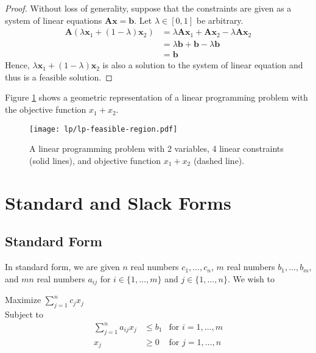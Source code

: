 \begin{proof}
    Without loss of generality, suppose that the constraints are given as a system of linear equations $\mathbf{A}\mathbf{x} = \mathbf{b}$. Let $\lambda \in [0,1]$ be arbitrary.
    $$
    \begin{aligned}
        \mathbf{A}(\lambda\mathbf{x}_1 + (1-\lambda)\mathbf{x}_2) &= \lambda\mathbf{A}\mathbf{x}_1 + \mathbf{A}\mathbf{x}_2 - \lambda\mathbf{A}\mathbf{x}_2 \\
        &= \lambda \mathbf{b} + \mathbf{b} - \lambda \mathbf{b} \\
        &= \mathbf{b}
    \end{aligned}
    $$
    Hence, $\lambda\mathbf{x}_1 + (1-\lambda)\mathbf{x}_2$ is also a solution to the system of linear equation and thus is a feasible solution.
\end{proof}

Figure \ref{fig:lp-feasible-region} shows a geometric representation of a linear programming problem with the objective function $x_1+x_2$.

\begin{figure}[htbp]
    \centering
    \texttt{[image: lp/lp-feasible-region.pdf]}
    \caption{A linear programming problem with 2 variables, 4 linear constraints (solid lines), and objective function $x_1+x_2$ (dashed line).}
    \label{fig:lp-feasible-region}
\end{figure}

\section{Standard and Slack Forms}

\subsection{Standard Form}

In standard form, we are given $n$ real numbers $c_1,\ldots,c_n$, $m$ real numbers $b_1,\ldots,b_m$, and $mn$ real numbers $a_{ij}$ for $i \in \{1,\ldots,m\}$ and $j \in \{1,\ldots,n\}$. We wish to

Maximize $\displaystyle \sum_{j=1}^n c_j x_j$ \\
Subject to
\[
    \begin{aligned}
        \sum_{j=1}^n a_{ij} x_j &\leq b_1 & \text{for $i = 1,\ldots,m$} \\
        x_j &\geq 0 & \text{for $j = 1,\ldots,n$}
    \end{aligned}
\]

